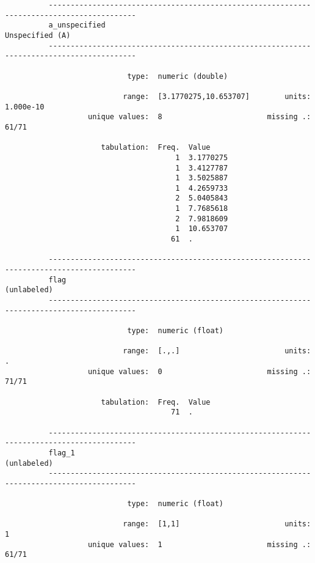 \documentclass{article}
\begin{document}
\begin{verbatim}
          ------------------------------------------------------------------------------------------
          a_unspecified                                                              Unspecified (A)
          ------------------------------------------------------------------------------------------
          
                            type:  numeric (double)
          
                           range:  [3.1770275,10.653707]        units:  1.000e-10
                   unique values:  8                        missing .:  61/71
          
                      tabulation:  Freq.  Value
                                       1  3.1770275
                                       1  3.4127787
                                       1  3.5025887
                                       1  4.2659733
                                       2  5.0405843
                                       1  7.7685618
                                       2  7.9818609
                                       1  10.653707
                                      61  .
          
          ------------------------------------------------------------------------------------------
          flag                                                                           (unlabeled)
          ------------------------------------------------------------------------------------------
          
                            type:  numeric (float)
          
                           range:  [.,.]                        units:  .
                   unique values:  0                        missing .:  71/71
          
                      tabulation:  Freq.  Value
                                      71  .
          
          ------------------------------------------------------------------------------------------
          flag_1                                                                         (unlabeled)
          ------------------------------------------------------------------------------------------
          
                            type:  numeric (float)
          
                           range:  [1,1]                        units:  1
                   unique values:  1                        missing .:  61/71
          

\end{verbatim}
\end{document}
